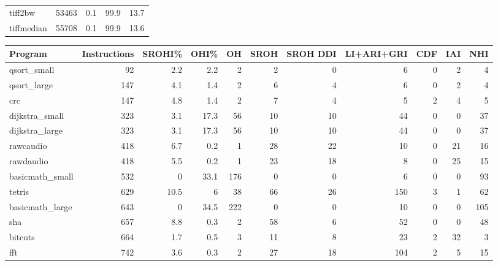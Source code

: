 \begin{tabular}{lrrrr}
 tiff2bw         &   53463 &    0.1 &         99.9 &    13.7 \\
 tiffmedian      &   55708 &    0.1 &         99.9 &    13.6 \\
\hline
\end{tabular}\begin{tabular}{lrrrrrrrrrr}
\hline
 Program         &   Instructions &   SROHI\% &   OHI\% &   OH &   SROH &   SROH DDI &   LI+ARI+GRI &   CDF &   IAI &   NHI \\
\hline
 qsort\_small     &             92 &      2.2 &    2.2 &    2 &      2 &          0 &            6 &     0 &     2 &     4 \\
 qsort\_large     &            147 &      4.1 &    1.4 &    2 &      6 &          4 &            6 &     0 &     2 &     4 \\
 crc             &            147 &      4.8 &    1.4 &    2 &      7 &          4 &            5 &     2 &     4 &     5 \\
 dijkstra\_small  &            323 &      3.1 &   17.3 &   56 &     10 &         10 &           44 &     0 &     0 &    37 \\
 dijkstra\_large  &            323 &      3.1 &   17.3 &   56 &     10 &         10 &           44 &     0 &     0 &    37 \\
 rawcaudio       &            418 &      6.7 &    0.2 &    1 &     28 &         22 &           10 &     0 &    21 &    16 \\
 rawdaudio       &            418 &      5.5 &    0.2 &    1 &     23 &         18 &            8 &     0 &    25 &    15 \\
 basicmath\_small &            532 &      0   &   33.1 &  176 &      0 &          0 &            6 &     0 &     0 &    93 \\
 tetris          &            629 &     10.5 &    6   &   38 &     66 &         26 &          150 &     3 &     1 &    62 \\
 basicmath\_large &            643 &      0   &   34.5 &  222 &      0 &          0 &           10 &     0 &     0 &   105 \\
 sha             &            657 &      8.8 &    0.3 &    2 &     58 &          6 &           52 &     0 &     0 &    48 \\
 bitcnts         &            664 &      1.7 &    0.5 &    3 &     11 &          8 &           23 &     2 &    32 &     3 \\
 fft             &            742 &      3.6 &    0.3 &    2 &     27 &         18 &          104 &     2 &     5 &    15 \\

\end{tabular}
